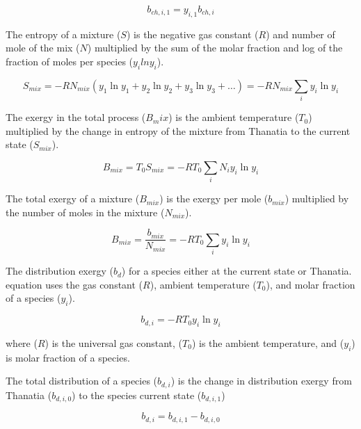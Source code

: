 \documentclass[journal,article,submit,pdftex,moreauthors]{Definitions/mdpi}
\begin{document}
\begin{equation}\label{eq:chemical_exergy_state_point1}
  b_{ch,i,1} = y_{i,1}b_{ch,i}
\end{equation}

The entropy of a mixture ($S$) is the negative gas constant ($R$)
and number of mole of the mix ($N$)
multiplied by the sum of the molar fraction
and log of the fraction of moles per species ($y_i$$lny_i$).

\begin{equation}\label{eq:specific_entropy_of_mixture_definition}
  S_{mix} = -RN_{mix}(y_{1}\ln{y_{1}} + y_{2}\ln{y_{2}} + y_{3}\ln{y_{3}} + \ldots)
          = -RN_{mix}\sum_{i} y_{i}\ln{y_{i}}
\end{equation}

The exergy in the total process ($B_mix$) is the ambient temperature ($T_{0}$) multiplied by the change
in entropy of the mixture from Thanatia to the current state ($S_{mix}$).

\begin{equation}\label{eq:specific_exergy_of_mixture_definition1}
  B_{mix} = T_{0}S_{mix} = -RT_{0}\sum_{i}{N_{i}{y_{i}}\ln{y_{i}}}
\end{equation}

The total exergy of a mixture ($B_{mix}$) is the exergy per mole ($b_{mix}$) multiplied by the number of moles
in the mixture ($N_{mix}$).

\begin{equation}\label{eq:specific_exergy_of_mixture_definition2}
  B_{mix} = \frac{b_{mix}}{N_{mix}} = -RT_{0}\sum_{i}y_{i}\ln{y_{i}}
\end{equation}

The distribution exergy ($b_d$)
for a species
either at the current state or Thanatia.
equation uses the gas constant ($R$), ambient temperature ($T_0$),
and molar fraction of a species ($y_i$).

\begin{equation}\label{eq:specific_distribution_exergy_of_current_statepoint_definition}
  b_{d,i} = -RT_{0}y_{i}\ln{y_{i}}
\end{equation}

where ($R$) is the universal gas constant,
($T_0$) is the ambient temperature,
and ($y_i$) is molar fraction of a species.

The total distribution of a species ($b_{d,i}$) is the change in distribution exergy from Thanatia ($b_{d,i,0}$)
to the species current state ($b_{d,i,1}$)

\begin{equation}\label{eq:specific_distribution_exergy_from_reference_statepoint_to_thanatia}
  b_{d,i} = b_{d,i,1} - b_{d,i,0}
\end{equation}
\end{document}

